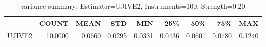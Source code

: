 \begin{table}[ht]
\centering
\caption{variance summary: Estimator=UJIVE2, Instruments=100, Strength=0.20}
\begin{tabular}{lrrrrrrrr}
\toprule
 & COUNT & MEAN & STD & MIN & 25\% & 50\% & 75\% & MAX \\
\midrule
UJIVE2 & 10.0000 & 0.0660 & 0.0295 & 0.0331 & 0.0436 & 0.0601 & 0.0780 & 0.1240 \\
\bottomrule
\end{tabular}
\end{table}
